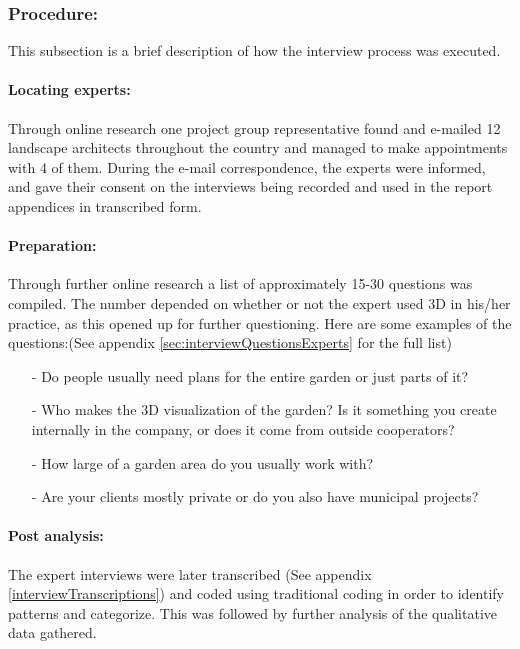 	\subsubsection{Procedure:}
	This subsection is a brief description of how the interview process was executed.
	
	\paragraph*{Locating experts:}
	Through online research one project group representative found and e-mailed 12 landscape architects throughout the country and managed to make appointments with 4 of them. During the e-mail correspondence, the experts were informed, and gave their consent on the interviews being recorded and used in the report appendices in transcribed form.
	
	\paragraph*{Preparation:}
	Through further online research a list of approximately 15-30 questions was compiled. The number depended on whether or not the expert used 3D in his/her practice, as this opened up for further questioning. Here are some examples of the questions:(See appendix \ref{sec:interviewQuestionsExperts} for the full list)
	
	\begin{itemize}
		\item[-] Do people usually need plans for the entire garden or just parts of it?
		\item[-] Who makes the 3D visualization of the garden? Is it something you create internally in the company, or does it come from outside cooperators? 
		\item[-] How large of a garden area do you usually work with?
		\item[-] Are your clients mostly private or do you also have municipal projects?
	\end{itemize}
	
	\paragraph*{Post analysis:}The expert interviews were later transcribed (See appendix \ref{interviewTranscriptions}) and coded using traditional coding in order to identify patterns and categorize. This was followed by further analysis of the qualitative data gathered.
		
